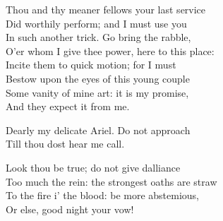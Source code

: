 \begin{verse_speech}[Prospero] 
Thou and thy meaner fellows your last service\\
Did worthily perform; and I must use you\\
In such another trick. Go bring the rabble,\\
O'er whom I give thee power, here to this place:\\
Incite them to quick motion; for I must\\
Bestow upon the eyes of this young couple\\
Some vanity of mine art: it is my promise,\\
And they expect it from me.
\end{verse_speech}



\begin{verse_speech}[Ariel] 
	\begin{song}
\end{song}
\end{verse_speech}


\begin{verse_speech}[Prospero] 
Dearly my delicate Ariel. Do not approach\\
Till thou dost hear me call.
\end{verse_speech}



\begin{verse_speech}[Prospero] 
Look thou be true; do not give dalliance\\
Too much the rein: the strongest oaths are straw\\
To the fire i' the blood: be more abstemious,\\
Or else, good night your vow!
\end{verse_speech}

